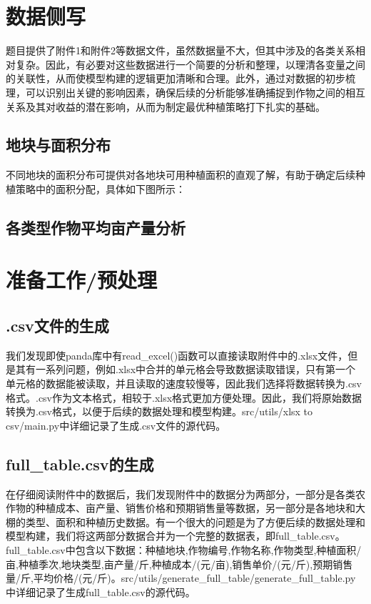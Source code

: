 \documentclass{cumcmthesis}
\begin{document}
\section{数据侧写}
题目提供了附件1和附件2等数据文件，虽然数据量不大，但其中涉及的各类关系相对复杂。因此，有必要对这些数据进行一个简要的分析和整理，以理清各变量之间的关联性，从而使模型构建的逻辑更加清晰和合理。此外，通过对数据的初步梳理，可以识别出关键的影响因素，确保后续的分析能够准确捕捉到作物之间的相互关系及其对收益的潜在影响，从而为制定最优种植策略打下扎实的基础。
\subsection{地块与面积分布}
不同地块的面积分布可提供对各地块可用种植面积的直观了解，有助于确定后续种植策略中的面积分配，具体如下图所示：


\subsection{各类型作物平均亩产量分析}

\section{准备工作/预处理}
\subsection{.csv文件的生成}
我们发现即使panda库中有read\_excel()函数可以直接读取附件中的.xlsx文件，但是其有一系列问题，例如.xlsx中合并的单元格会导致数据读取错误，只有第一个单元格的数据能被读取，并且读取的速度较慢等，因此我们选择将数据转换为.csv格式。.csv作为文本格式，相较于.xlsx格式更加方便处理。因此，我们将原始数据转换为.csv格式，以便于后续的数据处理和模型构建。src/utils/xlsx to csv/main.py中详细记录了生成.csv文件的源代码。

\subsection{full\_table.csv的生成}
在仔细阅读附件中的数据后，我们发现附件中的数据分为两部分，一部分是各类农作物的种植成本、亩产量、销售价格和预期销售量等数据，另一部分是各地块和大棚的类型、面积和种植历史数据。有一个很大的问题是为了方便后续的数据处理和模型构建，我们将这两部分数据合并为一个完整的数据表，即full\_table.csv。full\_table.csv中包含以下数据：种植地块,作物编号,作物名称,作物类型,种植面积/亩,种植季次,地块类型,亩产量/斤,种植成本/(元/亩),销售单价/(元/斤),预期销售量/斤,平均价格/(元/斤)。src/utils/generate\_full\_table/generate\_full\_table.py中详细记录了生成full\_table.csv的源代码。
\end{document}

